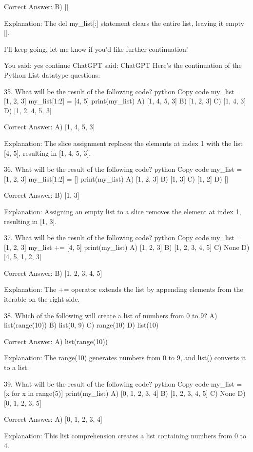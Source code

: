 Correct Answer: B) []

Explanation:
The del my_list[:] statement clears the entire list, leaving it empty [].

I'll keep going, let me know if you'd like further continuation!






You said:
yes continue
ChatGPT said:
ChatGPT
Here’s the continuation of the Python List datatype questions:

35. What will be the result of the following code?
python
Copy code
my_list = [1, 2, 3]
my_list[1:2] = [4, 5]
print(my_list)
A) [1, 4, 5, 3]
B) [1, 2, 3]
C) [1, 4, 3]
D) [1, 2, 4, 5, 3]

Correct Answer: A) [1, 4, 5, 3]

Explanation:
The slice assignment replaces the elements at index 1 with the list [4, 5], resulting in [1, 4, 5, 3].

36. What will be the result of the following code?
python
Copy code
my_list = [1, 2, 3]
my_list[1:2] = []
print(my_list)
A) [1, 2, 3]
B) [1, 3]
C) [1, 2]
D) []

Correct Answer: B) [1, 3]

Explanation:
Assigning an empty list to a slice removes the element at index 1, resulting in [1, 3].

37. What will be the result of the following code?
python
Copy code
my_list = [1, 2, 3]
my_list += [4, 5]
print(my_list)
A) [1, 2, 3]
B) [1, 2, 3, 4, 5]
C) None
D) [4, 5, 1, 2, 3]

Correct Answer: B) [1, 2, 3, 4, 5]

Explanation:
The += operator extends the list by appending elements from the iterable on the right side.

38. Which of the following will create a list of numbers from 0 to 9?
A) list(range(10))
B) list(0, 9)
C) range(10)
D) list(10)

Correct Answer: A) list(range(10))

Explanation:
The range(10) generates numbers from 0 to 9, and list() converts it to a list.

39. What will be the result of the following code?
python
Copy code
my_list = [x for x in range(5)]
print(my_list)
A) [0, 1, 2, 3, 4]
B) [1, 2, 3, 4, 5]
C) None
D) [0, 1, 2, 3, 5]

Correct Answer: A) [0, 1, 2, 3, 4]

Explanation:
This list comprehension creates a list containing numbers from 0 to 4.

